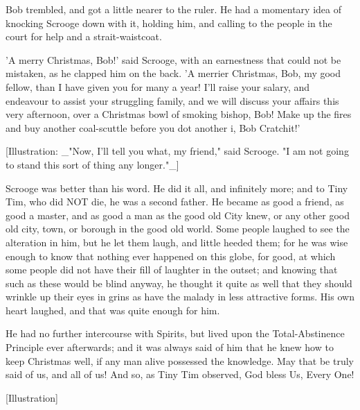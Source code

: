 Bob trembled, and got a little nearer to the ruler. He had a momentary
idea of knocking Scrooge down with it, holding him, and calling to the
people in the court for help and a strait-waistcoat.

'A merry Christmas, Bob!' said Scrooge, with an earnestness that could
not be mistaken, as he clapped him on the back. 'A merrier Christmas,
Bob, my good fellow, than I have given you for many a year! I'll raise
your salary, and endeavour to assist your struggling family, and we will
discuss your affairs this very afternoon, over a Christmas bowl of
smoking bishop, Bob! Make up the fires and buy another coal-scuttle
before you dot another i, Bob Cratchit!'

[Illustration: _"Now, I'll tell you what, my friend," said Scrooge. "I
am not going to stand this sort of thing any longer."_]

Scrooge was better than his word. He did it all, and infinitely more;
and to Tiny Tim, who did NOT die, he was a second father. He became as
good a friend, as good a master, and as good a man as the good old
City knew, or any other good old city, town, or borough in the good old
world. Some people laughed to see the alteration in him, but he let them
laugh, and little heeded them; for he was wise enough to know that
nothing ever happened on this globe, for good, at which some people did
not have their fill of laughter in the outset; and knowing that such as
these would be blind anyway, he thought it quite as well that they
should wrinkle up their eyes in grins as have the malady in less
attractive forms. His own heart laughed, and that was quite enough for
him.

He had no further intercourse with Spirits, but lived upon the
Total-Abstinence Principle ever afterwards; and it was always said of
him that he knew how to keep Christmas well, if any man alive possessed
the knowledge. May that be truly said of us, and all of us! And so, as
Tiny Tim observed, God bless Us, Every One!

[Illustration]